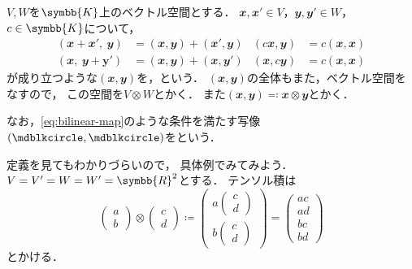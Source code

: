 \documentclass[../sotsu.tex]{subfiles}
\begin{document}
$V, W$を$\symbb{K}$上のベクトル空間とする．
$𝒙, 𝒙' \in V$，$𝒚, 𝒚' \in W$，$c \in \symbb{K}$について，
\begin{subequations}
\label{eq:bilinear-map}
\begin{align}
    (𝒙 + 𝒙', \  𝒚) &= (𝒙, 𝒚) + (𝒙', 𝒚)
    &
    (c𝒙, 𝒚) &= c(𝒙, 𝒙)
    \\
    (𝒙, \  𝒚 + \symbf{y'}) &= (𝒙, 𝒚) + (𝒙, 𝒚')
    &
    (𝒙, c𝒚) &= c(𝒙, 𝒙)
\end{align}
\end{subequations}
が成り立つような$(𝒙, 𝒚)$を，という．
$(𝒙, 𝒚)$の全体もまた，ベクトル空間をなすので，
この空間を$V \otimes W$とかく．
また$(𝒙, 𝒚) \eqcolon 𝒙 \otimes 𝒚$とかく．

なお，\cref{eq:bilinear-map}のような条件を満たす写像$(\bigdot, \bigdot)$をという．

定義を見てもわかりづらいので，
具体例でみてみよう．
$V = V' = W = W' = \symbb{R}^2$とする．
テンソル積は
\begin{equation*}
    \begin{pmatrix}
        a \\ b
    \end{pmatrix}
    \otimes
    \begin{pmatrix}
        c \\ d
    \end{pmatrix}
    \coloneq
    \begin{pmatrix}
        a 
        \begin{pmatrix}
            c \\ d
        \end{pmatrix}
        \\
        b
        \begin{pmatrix}
            c \\ d
        \end{pmatrix}
    \end{pmatrix}
    =
    \begin{pmatrix}
        ac \\ ad \\ bc \\ bd
    \end{pmatrix}
\end{equation*}
とかける．
\end{document}
